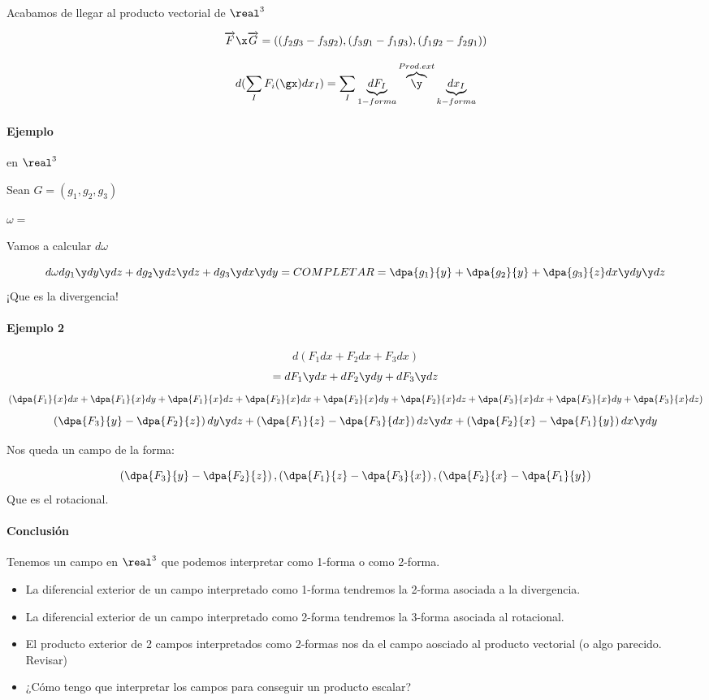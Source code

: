\obs Acabamos de llegar al producto vectorial de $\real^3$ 

\[\overrightarrow{F}\x\overrightarrow{G} = 
\left((f_2g_3-f_3g_2),(f_3g_1-f_1g_3),(f_1g_2 - f_2g_1)\right)\]

\begin{defn}

\[d(\sum_I F_i(\gx)dx_I) = \sum_I \underbrace{dF_I}_{1-forma} \overbrace{\y}^{Prod.ext} \underbrace{dx_I}_{k-forma}\]
\end{defn}

\paragraph{Ejemplo} en $\real^3$

Sean $G = (g_1,g_2,g_3)$

$\omega = $

Vamos a calcular $d\omega$

\[d\omega dg_1\y dy\y dz + dg_2 \y dz\y dz + dg_3 \y dx \y dy = COMPLETAR = \dpa{g_1}{y} + \dpa{g_2}{y}+\dpa{g_3}{z}dx\y dy\y dz\] ¡Que es la divergencia!

\paragraph{Ejemplo 2}

\[d(F_1 dx + F_2dx+F_3dx)\]
\[ = dF_1\y dx + dF_2 \y dy + dF_3\y dz\]
\[\left(\dpa{F_1}{x}dx + \dpa{F_1}{x}dy + \dpa{F_1}{x}dz +
\dpa{F_2}{x}dx + \dpa{F_2}{x}dy + \dpa{F_2}{x}dz+
\dpa{F_3}{x}dx + \dpa{F_3}{x}dy + \dpa{F_3}{x}dz\right)\]
\[\left(\dpa{F_3}{y} - \dpa{F_2}{z} \right)dy\y dz + \left(\dpa{F_1}{z} - \dpa{F_3}{dx}\right)dz \y dx + \left(\dpa{F_2}{x} - \dpa{F_1}{y}\right) dx \y dy\]

Nos queda un campo de la forma:

\[\left(\dpa{F_3}{y} - \dpa{F_2}{z} \right) ,\left(\dpa{F_1}{z} - \dpa{F_3}{x}\right),\left(\dpa{F_2}{x} - \dpa{F_1}{y}\right)\]
Que es el rotacional.

\paragraph{Conclusión}
Tenemos un campo en $\real^3$ que podemos interpretar como 1-forma o como 2-forma. 

\begin{itemize}
\item La diferencial exterior de un campo interpretado como 1-forma tendremos la 2-forma asociada a la divergencia.

\item La diferencial exterior de un campo interpretado como 2-forma tendremos la 3-forma asociada al rotacional.

\item El producto exterior de 2 campos interpretados como 2-formas nos da el campo aosciado al producto vectorial (o algo parecido. Revisar)

\item ¿Cómo tengo que interpretar los campos para conseguir un producto escalar?

\end{itemize} 



